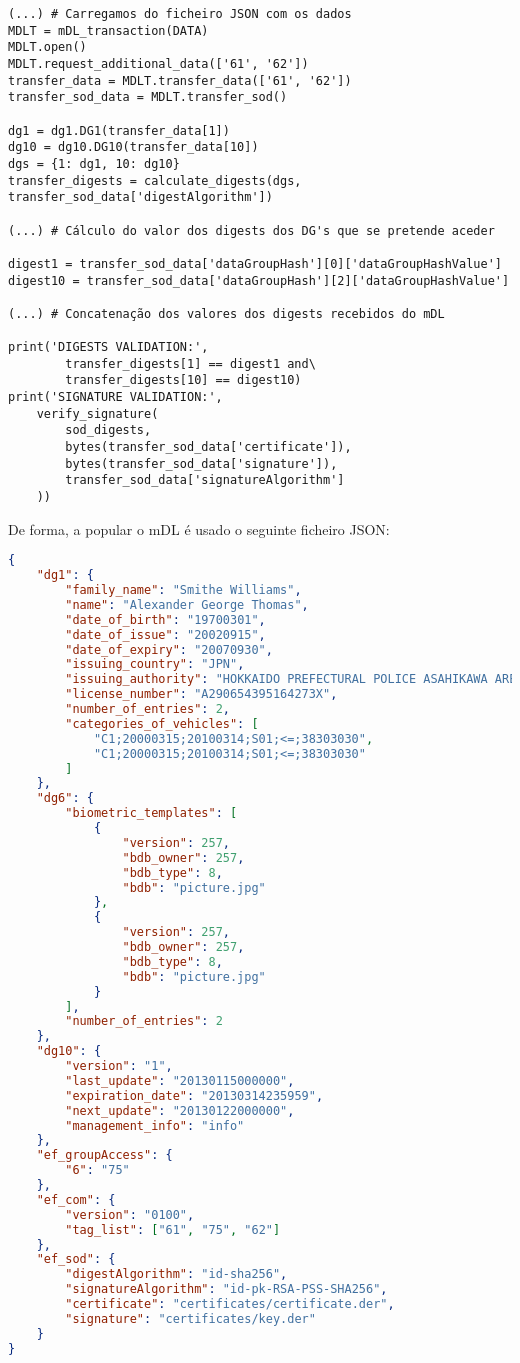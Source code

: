 \begin{Verbatim}[frame=single, framerule=0.5mm]
(...) # Carregamos do ficheiro JSON com os dados
MDLT = mDL_transaction(DATA)
MDLT.open()
MDLT.request_additional_data(['61', '62'])
transfer_data = MDLT.transfer_data(['61', '62'])
transfer_sod_data = MDLT.transfer_sod()

dg1 = dg1.DG1(transfer_data[1])
dg10 = dg10.DG10(transfer_data[10])
dgs = {1: dg1, 10: dg10}
transfer_digests = calculate_digests(dgs, transfer_sod_data['digestAlgorithm'])

(...) # Cálculo do valor dos digests dos DG's que se pretende aceder

digest1 = transfer_sod_data['dataGroupHash'][0]['dataGroupHashValue']
digest10 = transfer_sod_data['dataGroupHash'][2]['dataGroupHashValue']

(...) # Concatenação dos valores dos digests recebidos do mDL

print('DIGESTS VALIDATION:',
        transfer_digests[1] == digest1 and\
        transfer_digests[10] == digest10)
print('SIGNATURE VALIDATION:',
    verify_signature(
        sod_digests,
        bytes(transfer_sod_data['certificate']),
        bytes(transfer_sod_data['signature']),
        transfer_sod_data['signatureAlgorithm']
    ))
\end{Verbatim}

De forma, a popular o mDL é usado o seguinte ficheiro JSON:

\begin{lstlisting}[language=json]
{
    "dg1": {
        "family_name": "Smithe Williams",
        "name": "Alexander George Thomas",
        "date_of_birth": "19700301",
        "date_of_issue": "20020915",
        "date_of_expiry": "20070930",
        "issuing_country": "JPN",
        "issuing_authority": "HOKKAIDO PREFECTURAL POLICE ASAHIKAWA AREA SAFETY PUBLIC",
        "license_number": "A290654395164273X",
        "number_of_entries": 2,
        "categories_of_vehicles": [
            "C1;20000315;20100314;S01;<=;38303030",
            "C1;20000315;20100314;S01;<=;38303030"
        ]
    },
    "dg6": {
        "biometric_templates": [
            {
                "version": 257,
                "bdb_owner": 257,
                "bdb_type": 8,
                "bdb": "picture.jpg"
            },
            {
                "version": 257,
                "bdb_owner": 257,
                "bdb_type": 8,
                "bdb": "picture.jpg"
            }
        ],
        "number_of_entries": 2
    },
    "dg10": {
        "version": "1",
        "last_update": "20130115000000",
        "expiration_date": "20130314235959",
        "next_update": "20130122000000",
        "management_info": "info"
    },
    "ef_groupAccess": {
        "6": "75"
    },
    "ef_com": {
        "version": "0100",
        "tag_list": ["61", "75", "62"]
    },
    "ef_sod": {
        "digestAlgorithm": "id-sha256",
        "signatureAlgorithm": "id-pk-RSA-PSS-SHA256",
        "certificate": "certificates/certificate.der",
        "signature": "certificates/key.der"
    }
}
\end{lstlisting}

